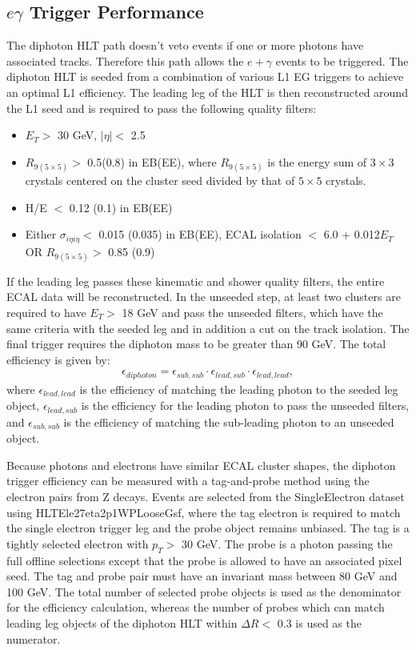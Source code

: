 \documentclass[thesis.tex]{subfiles}
\renewcommand\_{\textunderscore\allowbreak}
\begin{document}
\subsection{$e\gamma$ Trigger Performance}
The diphoton HLT path doesn't veto events if one or more photons have associated tracks. 
Therefore this path allows the $e+\gamma$ events to be triggered.
The diphoton HLT is seeded from a combination of various L1 EG triggers to achieve an optimal L1 efficiency. 
The leading leg of the HLT is then reconstructed around the L1 seed and is required to pass the following quality filters: 
\begin{itemize}
	\item $E_T > $ 30 GeV, $|\eta| < $ 2.5
	\item $R_{9 (5\times5)} >$ 0.5(0.8) in EB(EE), where $R_{9(5\times5)}$ is the energy sum of $3\times3$ crystals centered on the cluster seed divided by that of $5\times5$ crystals.
	\item H/E $<$ 0.12 (0.1) in EB(EE)
	\item Either $\sigma_{i\eta i\eta} <$ 0.015 (0.035) in EB(EE), ECAL isolation $<$ 6.0 + 0.012$E_T$ \\
		OR $R_{9 (5\times5)} >$ 0.85 (0.9)
\end{itemize}

If the leading leg passes these kinematic and shower quality filters, the entire ECAL data will be reconstructed. 
In the unseeded step, at least two clusters are required to have $E_T > $ 18 GeV and pass the unseeded filters, which have the same criteria with the seeded leg and in addition a cut on the track isolation. 
The final trigger requires the diphoton mass to be greater than 90 GeV. The total efficiency is given by:
\begin{eqnarray*}
	\epsilon_{diphoton} = \epsilon_{sub, sub} \cdot \epsilon_{lead, sub} \cdot \epsilon_{lead, lead},
\end{eqnarray*}
where $\epsilon_{lead, lead}$ is the efficiency of matching the leading photon to the seeded leg object, $\epsilon_{lead, sub}$ is the efficiency for the leading photon to pass the unseeded filters, and $ \epsilon_{sub, sub}$ is the efficiency of matching the sub-leading photon to an unseeded object. 

Because photons and electrons have similar ECAL cluster shapes, the diphoton trigger efficiency can be measured with a tag-and-probe method using the electron pairs from Z decays. 
Events are selected from the SingleElectron dataset using HLT\_Ele27\_eta2p1\_WPLoose\_Gsf, where the tag electron is required to match the single electron trigger leg and the probe object remains unbiased. 
The tag is a tightly selected electron with $p_T >$ 30 GeV.  
The probe is a photon passing the full offline selections except that the probe is allowed to have an associated pixel seed.
The tag and probe pair must have an invariant mass between 80 GeV and 100 GeV. 
The total number of selected probe objects is used as the denominator for the efficiency calculation, whereas the number of probes which can match leading leg objects of the diphoton HLT within $\Delta R <$ 0.3 is used as the numerator. 
\end{document}
